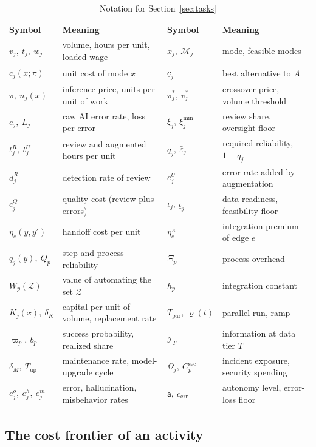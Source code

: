 \begin{table}[t]
\centering
\caption{Notation for Section~\ref{sec:tasks}}\label{tab:tasks-notation}
\small
\begin{tabular}{@{}ll@{\qquad}ll@{}}
\toprule
Symbol & Meaning & Symbol & Meaning\\
\midrule
$v_j,\ t_j,\ w_j$ & volume, hours per unit, loaded wage & $x_j,\ \mathcal M_j$ & mode, feasible modes\\
$c_j(x;\pi)$ & unit cost of mode $x$ & $\underline c_j$ & best alternative to $A$\\
$\pi,\ n_j(x)$ & inference price, units per unit of work & $\pi^*_j,\ v^*_j$ & crossover price, volume threshold\\
$e_j,\ L_j$ & raw AI error rate, loss per error & $\xi_j,\ \xi^{\min}_j$ & review share, oversight floor\\
$t^R_j,\ t^U_j$ & review and augmented hours per unit & $\bar q_j,\ \bar\varepsilon_j$ & required reliability, $1-\bar q_j$\\
$d^R_j$ & detection rate of review & $e^U_j$ & error rate added by augmentation\\
$c^Q_j$ & quality cost (review plus errors) & $\iota_j,\ \underline\iota_j$ & data readiness, feasibility floor\\
$\eta_e(y,y')$ & handoff cost per unit & $\eta^\times_e$ & integration premium of edge $e$\\
$q_j(y),\ Q_p$ & step and process reliability & $\Xi_p$ & process overhead\\
$W_p(\mathcal Z)$ & value of automating the set $\mathcal Z$ & $h_p$ & integration constant\\
$K_j(x),\ \delta_K$ & capital per unit of volume, replacement rate & $T_{\mathrm{par}},\ \varrho(t)$ & parallel run, ramp\\
$\varpi_p,\ b_p$ & success probability, realized share & $\mathcal I_T$ & information at data tier $T$\\
$\delta_M,\ T_{\mathrm{up}}$ & maintenance rate, model-upgrade cycle & $\Omega_j,\ C^{\mathrm{sec}}_p$ & incident exposure, security spending\\
$e^o_j,\ e^h_j,\ e^m_j$ & error, hallucination, misbehavior rates & $\mathsf a,\ c_{\mathrm{err}}$ & autonomy level, error-loss floor\\
\bottomrule
\end{tabular}
\end{table}

\subsection{The cost frontier of an activity}\label{sec:tasks-frontier}

